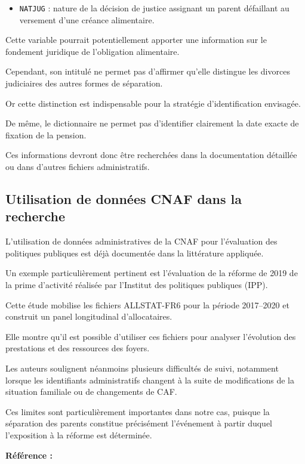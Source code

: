 \documentclass[11pt,a4paper]{article}
\begin{document}
\begin{itemize}
    \item \texttt{NATJUG} :
    nature de la décision de justice
    assignant un parent défaillant
    au versement d'une créance alimentaire.
\end{itemize}

Cette variable pourrait
potentiellement apporter
une information sur le
fondement juridique de
l'obligation alimentaire.

Cependant, son intitulé
ne permet pas d'affirmer
qu'elle distingue les divorces
judiciaires des autres
formes de séparation.

Or cette distinction
est indispensable pour
la stratégie d'identification
envisagée.

De même, le dictionnaire
ne permet pas d'identifier
clairement la date exacte
de fixation de la pension.

Ces informations devront
donc être recherchées
dans la documentation détaillée
ou dans d'autres fichiers
administratifs.

\subsection{Utilisation de données CNAF dans la recherche}

L'utilisation de données
administratives de la CNAF
pour l'évaluation des politiques
publiques est déjà documentée
dans la littérature appliquée.

Un exemple particulièrement
pertinent est l'évaluation
de la réforme de 2019
de la prime d'activité
réalisée par l'Institut
des politiques publiques (IPP).

Cette étude mobilise
les fichiers ALLSTAT-FR6
pour la période 2017--2020
et construit un panel
longitudinal d'allocataires.

Elle montre qu'il est
possible d'utiliser
ces fichiers pour analyser
l'évolution des prestations
et des ressources des foyers.

Les auteurs soulignent
néanmoins plusieurs
difficultés de suivi,
notamment lorsque les
identifiants administratifs
changent à la suite
de modifications de
la situation familiale
ou de changements de CAF.

Ces limites sont
particulièrement importantes
dans notre cas, puisque
la séparation des parents
constitue précisément
l'événement à partir duquel
l'exposition à la réforme
est déterminée.

\medskip

\noindent
\textbf{Référence :}
\end{document}
